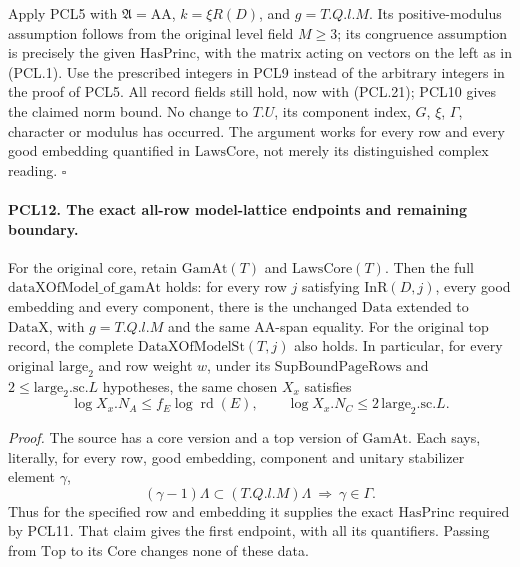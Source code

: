 \documentclass[11pt,a4paper]{article}
\numberwithin{equation}{section}
\theoremstyle{remark}\newtheorem{remark}[theorem]{Remark}
\begin{document}
Apply PCL5 with \(\mathfrak A=\mathrm{AA}\),
\(k=\xi R(D)\), and \(g=T.Q.l.M\).
Its positive-modulus assumption follows from the
original level field \(M\ge3\); its congruence assumption
is precisely the given \(\mathrm{HasPrinc}\), with the
matrix acting on vectors on the left as in (PCL.1).
Use the prescribed integers in PCL9 instead of the
arbitrary integers in the proof of PCL5.  All record
fields still hold, now with (PCL.21); PCL10 gives the
claimed norm bound.  No change to \(T.U\), its component
index, \(G\), \(\xi\), \(\Gamma\), character or modulus
has occurred.  The argument works for every row and
every good embedding quantified in \(\mathrm{LawsCore}\),
not merely its distinguished complex reading.
\hfill\(\square\)

\paragraph{PCL12. The exact all-row model-lattice endpoints and remaining boundary.}
\label{claim:PCL12}
For the original core, retain \(\mathrm{GamAt}(T)\) and
\(\mathrm{LawsCore}(T)\).  Then the full
\(\mathrm{dataXOfModel\_\allowbreak of\_\allowbreak gamAt}\) holds: for every
row \(j\) satisfying \(\mathrm{InR}(D,j)\), every good
embedding and every component, there is
the unchanged \(\mathrm{Data}\) extended to \(\mathrm{DataX}\),
with \(g=T.Q.l.M\) and the same \(\mathrm{AA}\)-span equality.
For the original top record, the complete
\(\mathrm{DataXOfModelSt}(T,j)\) also holds.  In particular,
for every original \(\mathrm{large}_2\) and row weight \(w\),
under its \(\mathrm{SupBoundPageRows}\) and
\(2\le\mathrm{large}_2.\mathrm{sc}.L\) hypotheses, the
same chosen \(X_x\) satisfies
\[
 \log X_x.N_A\le f_E\log\operatorname{rd}(E),\qquad
 \log X_x.N_C\le2\,\mathrm{large}_2.\mathrm{sc}.L.     \tag{PCL.22}
\]

\emph{Proof.}
The source has a core version and a top version of
\(\mathrm{GamAt}\).  Each says, literally, for every
row, good embedding, component and unitary stabilizer
element \(\gamma\),
\[
       (\gamma-1)\Lambda\subset (T.Q.l.M)\Lambda
                      \ \Longrightarrow\ \gamma\in\Gamma.
                                                               \tag{PCL.23}
\]
Thus for the specified row and embedding it supplies
the exact \(\mathrm{HasPrinc}\) required by PCL11.
That claim gives the first endpoint, with all its
quantifiers.  Passing from \(\mathrm{Top}\) to its
\(\mathrm{Core}\) changes none of these data.
\end{document}
